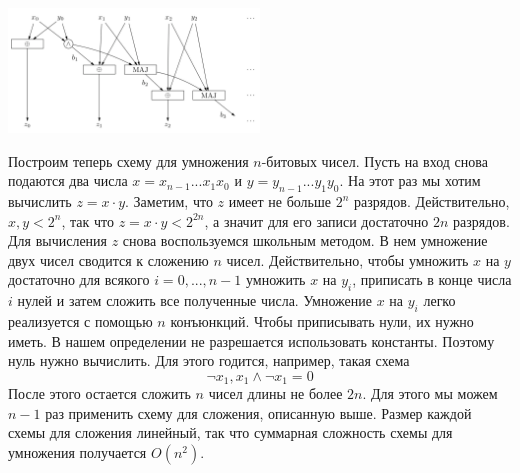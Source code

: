 \documentclass{article}
\begin{document}
\begin{center}
    \includegraphics[width=0.5\textwidth]{sum}
\end{center}
Построим теперь схему для умножения $n$-битовых чисел. Пусть на вход снова подаются два числа $x = x_{n-1} ...x_1x_0$ и $y = y_{n-1} ...y_1y_0$. На этот раз мы хотим вычислить $z = x \cdot y$. Заметим, что $z$ имеет не больше $2^n$ разрядов. Действительно, $x,y < 2^n$, так что $z = x \cdot y < 2^{2n}$, а значит для его записи достаточно $2n$ разрядов.
\newline
Для вычисления $z$ снова воспользуемся школьным методом. В нем умножение двух чисел сводится к сложению $n$ чисел. Действительно, чтобы умножить $x$ на $y$ достаточно для всякого $i = 0, ... , n - 1$ умножить $x$ на $y_i$, приписать в конце числа $i$ нулей и затем сложить все полученные числа.
\newline
Умножение $x$ на $y_i$ легко реализуется с помощью $n$ конъюнкций. Чтобы приписывать нули, их нужно иметь. В нашем определении не разрешается использовать константы. Поэтому нуль нужно вычислить. Для этого годится, например, такая схема
\[
\neg x_1, x_1 \wedge \neg x_1 = 0
\]
После этого остается сложить $n$ чисел длины не более $2n$. Для этого мы можем $n-1$ раз применить схему для сложения, описанную выше. Размер каждой схемы для сложения линейный, так что суммарная сложность схемы для умножения получается $O(n^2)$.
\end{document}
